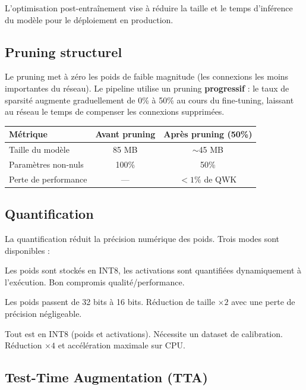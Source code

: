 ﻿\documentclass[11pt,a4paper]{article}
\begin{document}
L'optimisation post-entraînement vise à réduire la taille et le temps d'inférence du modèle pour le déploiement en production.

\subsection{Pruning structurel}

Le pruning met à zéro les poids de faible magnitude (les connexions les moins importantes du réseau). Le pipeline utilise un pruning \textbf{progressif} : le taux de sparsité augmente graduellement de 0\% à 50\% au cours du fine-tuning, laissant au réseau le temps de compenser les connexions supprimées.

\begin{center}
\renewcommand{\arraystretch}{1.3}
\begin{tabular}{lcc}
\toprule
\textbf{Métrique} & \textbf{Avant pruning} & \textbf{Après pruning (50\%)} \\
\midrule
Taille du modèle & 85 MB & $\sim$45 MB \\
Paramètres non-nuls & 100\% & 50\% \\
Perte de performance & --- & $< 1\%$ de QWK \\
\bottomrule
\end{tabular}
\end{center}

\subsection{Quantification}

La quantification réduit la précision numérique des poids. Trois modes sont disponibles :

\begin{description}[leftmargin=2em]
  \item[Dynamic (INT8)] Les poids sont stockés en INT8, les activations sont quantifiées dynamiquement à l'exécution. Bon compromis qualité/performance.
  \item[Float16] Les poids passent de 32 bits à 16 bits. Réduction de taille $\times 2$ avec une perte de précision négligeable.
  \item[Full INT8] Tout est en INT8 (poids et activations). Nécessite un dataset de calibration. Réduction $\times 4$ et accélération maximale sur CPU.
\end{description}

\subsection{Test-Time Augmentation (TTA)}
\end{document}

